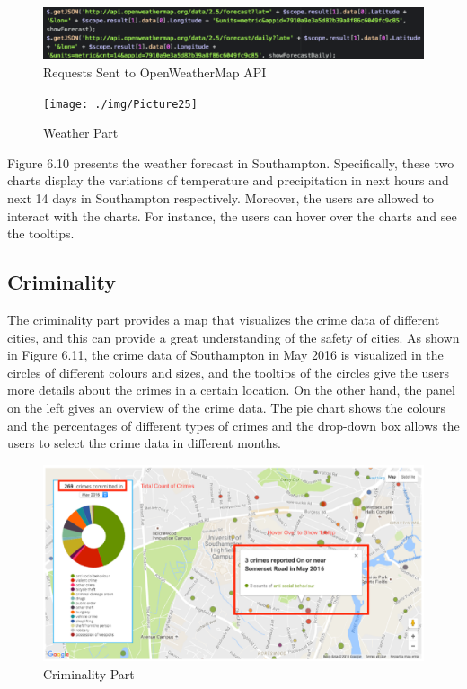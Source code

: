 \begin{figure}[H]
  \centering
  \includegraphics[width=15cm]{./img/Picture24}
  \caption{Requests Sent to OpenWeatherMap API
}
  \label{Figure:figex}
\end{figure}

\begin{figure}[H]
  \centering
  \texttt{[image: ./img/Picture25]}
  \caption{Weather Part
}
  \label{Figure:figex}
\end{figure}

Figure 6.10 presents the weather forecast in Southampton. Specifically, these two charts display the variations of temperature and precipitation in next hours and next 14 days in Southampton respectively. Moreover, the users are allowed to interact with the charts. For instance, the users can hover over the charts and see the tooltips. 




\subsection{Criminality}

The criminality part provides a map that visualizes the crime data of different cities, and this can provide a great understanding of the safety of cities. As shown in Figure 6.11, the crime data of Southampton in May 2016 is visualized in the circles of different colours and sizes, and the tooltips of the circles give the users more details about the crimes in a certain location. On the other hand, the panel on the left gives an overview of the crime data. The pie chart shows the colours and the percentages of different types of crimes and the drop-down box allows the users to select the crime data in different months.

\begin{figure}[H]
  \centering
  \includegraphics[width=15cm]{./img/Picture26}
  \caption{Criminality Part
}
  \label{Figure:figex}
\end{figure}


